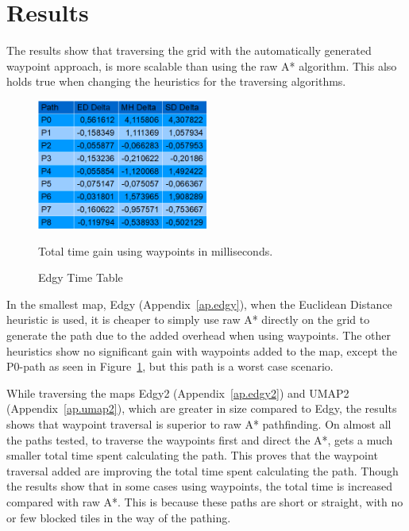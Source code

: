 \documentclass[sigconf]{acmart}
\begin{document}
\section{Results}
The results show that traversing the grid with the automatically generated waypoint approach, is more scalable than using the raw A* algorithm. This also holds true when changing the heuristics for the traversing algorithms.
\begin{figure}[h!]
\centering
\includegraphics[width=0.5\textwidth,height=\textheight,keepaspectratio]{ChartsAndFigures/Edgy_timeTable.png}
\caption{Edgy Time Table}
Total time gain using waypoints in milliseconds.
\label{fig:Edgy_cd}
\end{figure}
In the smallest map, Edgy (Appendix~\ref{ap.edgy}), when the Euclidean Distance heuristic is used, it is cheaper to simply use raw A* directly on the grid to generate the path due to the added overhead when using waypoints. The other heuristics show no significant gain with waypoints added to the map, except the P0-path as seen in Figure~\ref{fig:Edgy_cd}, but this path is a worst case scenario.
	
While traversing the maps Edgy2 (Appendix~\ref{ap.edgy2}) and UMAP2 (Appendix~\ref{ap.umap2}), which are greater in size compared to Edgy, the results shows that waypoint traversal is superior to raw A* pathfinding. On almost all the paths tested, to traverse the waypoints first and direct the A*, gets a much smaller total time spent calculating the path. This proves that the waypoint traversal added are improving the total time spent calculating the path. Though the results show that in some cases using waypoints, the total time is increased compared with raw A*. This is because these paths are short or straight, with no or few blocked tiles in the way of the pathing.
	
\end{document}
